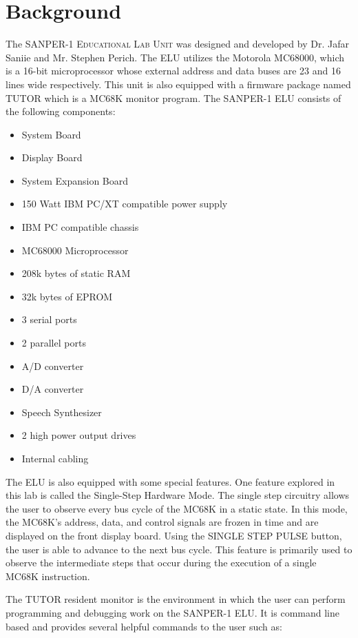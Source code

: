 \documentclass[12pt, twocolumn]{article}
\begin{document}
\section{Background}
The \textsc{SANPER-1 Educational Lab Unit} was designed and developed by Dr. Jafar Saniie and Mr. Stephen Perich. The \textsc{ELU} utilizes the Motorola MC68000, which is a 16-bit microprocessor whose external address and data buses are 23 and 16 lines wide respectively. This unit is also equipped with a firmware package named \textsc{TUTOR} which is a MC68K monitor program\cite{sanper}. The \textsc{SANPER-1 ELU} consists of the following components:
\begin{itemize}
	\item System Board
	\item Display Board
	\item System Expansion Board
	\item 150 Watt IBM PC/XT compatible power supply
	\item IBM PC compatible chassis
	\item MC68000 Microprocessor
	\item 208k bytes of static RAM
	\item 32k bytes of EPROM
	\item 3 serial ports
	\item 2 parallel ports
	\item A/D converter
	\item D/A converter
	\item Speech Synthesizer
	\item 2 high power output drives
	\item Internal cabling
\end{itemize}
The \textsc{ELU} is also equipped with some special features. One feature explored in this lab is called the Single-Step Hardware Mode. The single step circuitry allows the user to observe every bus cycle of the MC68K in a static state\cite{sanper}. In this mode, the MC68K's address, data, and control signals are frozen in time and are displayed on the front display board. Using the \textsc{SINGLE STEP PULSE} button, the user is able to advance to the next bus cycle. This feature is primarily used to observe the intermediate steps that occur during the execution of a single MC68K instruction.

The \textsc{TUTOR} resident monitor is the environment in which the user can perform programming and debugging work on the \textsc{SANPER-1 ELU}. It is command line based and provides several helpful commands to the user such as:
\end{document}
